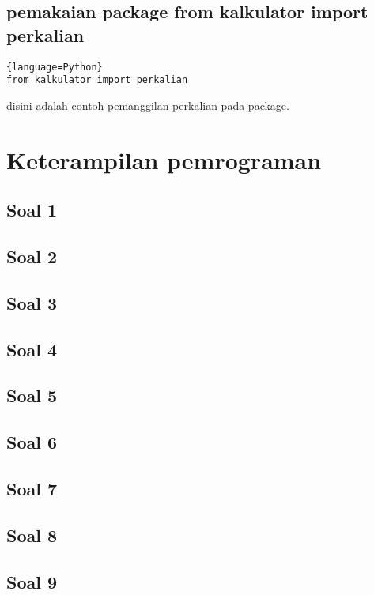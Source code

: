 \documentclass[a4paper,12pt]{report}
\begin{document}
\section{pemakaian package from kalkulator import perkalian}
\begin{lstlisting}{language=Python}
from kalkulator import perkalian
\end{lstlisting}
disini adalah contoh pemanggilan perkalian pada package.


\chapter{Keterampilan pemrograman}
\section*{Soal 1}

\section*{Soal 2}

\section*{Soal 3}

\section*{Soal 4}

\section*{Soal 5}

\section*{Soal 6}

\section*{Soal 7}

\section*{Soal 8}

\section*{Soal 9}

\end{document}
